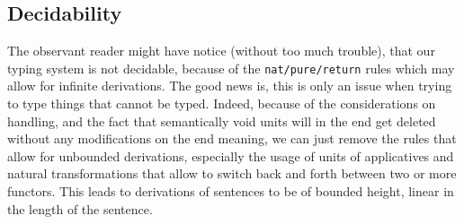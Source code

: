 \subsection{Decidability}
The observant reader might have notice (without too much trouble), that our
typing system is not decidable, because of the \texttt{nat/pure/return} rules
which may allow for infinite derivations.
The good news is, this is only an issue when trying to type things that cannot
be typed.
Indeed, because of the considerations on handling, and the fact that
semantically void units will in the end get deleted without any modifications
on the end meaning, we can just remove the rules that allow for unbounded
derivations, especially the usage of units of applicatives and natural
transformations that allow to switch back and forth between two or more
functors.
This leads to derivations of sentences to be of bounded height, linear in the
length of the sentence.
